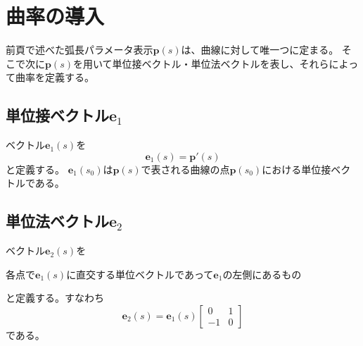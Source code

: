 \documentclass[a4j,disablejfam,dvipdfmx,papersize,slide,uplatex,21pt]{jsarticle}
\begin{document}
\section{曲率の導入}
前頁で述べた弧長パラメータ表示$\bm{p}(s)$は、曲線に対して唯一つに定まる。
そこで次に$\bm{p}(s)$を用いて単位接ベクトル・単位法ベクトルを表し、それらによって曲率を定義する。

\newpage
\subsection*{単位接ベクトル$\bm{e}_1$}
ベクトル$\bm{e}_1(s)$を
\begin{equation}
    \bm{e}_1(s) = \bm{p}'(s)
\end{equation}
と定義する。
$\bm{e}_1(s_0)$は$\bm{p}(s)$で表される曲線の点$\bm{p}(s_0)$における単位接ベクトルである。

\newpage
\subsection*{単位法ベクトル$\bm{e}_2$}
ベクトル$\bm{e}_2(s)$を
\begin{center}
    各点で$\bm{e}_1(s)$に直交する単位ベクトルであって$\bm{e}_1$の左側にあるもの
\end{center}
と定義する。すなわち
\begin{equation}
    \bm{e}_2(s) = \bm{e}_1(s)
    \left[
    \begin{array}{cc}
        0 & 1 \\
        -1 & 0
    \end{array}
    \right]
\end{equation}
である。

\newpage
\end{document}
